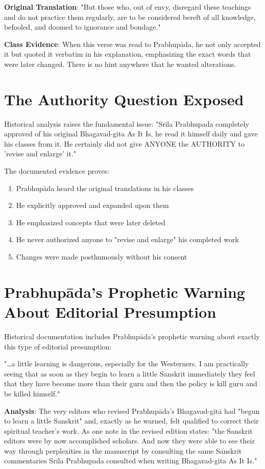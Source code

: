 \documentclass[11pt,twoside]{book}
\begin{document}
\textbf{\textbf{Original Translation}}: "But those who, out of envy, disregard these teachings and do not practice them regularly, are to be considered bereft of all knowledge, befooled, and doomed to ignorance and bondage."

\textbf{\textbf{Class Evidence}}: When this verse was read to Prabhupāda, he not only accepted it but quoted it verbatim in his explanation, emphasizing the exact words that were later changed. There is no hint anywhere that he wanted alterations.
\section*{The Authority Question Exposed}
\label{sec:orge9bd480}

Historical analysis raises the fundamental issue: "Srila Prabhupada completely approved of his original Bhagavad-gita As It Is, he read it himself daily and gave his classes from it. He certainly did not give ANYONE the AUTHORITY to 'revise and enlarge' it."

The documented evidence proves:
\begin{enumerate}
\item Prabhupāda heard the original translations in his classes
\item He explicitly approved and expanded upon them
\item He emphasized concepts that were later deleted
\item He never authorized anyone to "revise and enlarge" his completed work
\item Changes were made posthumously without his consent
\end{enumerate}
\section*{Prabhupāda's Prophetic Warning About Editorial Presumption}
\label{sec:org0435446}

Historical documentation includes Prabhupāda's prophetic warning about exactly this type of editorial presumption:

"\ldots{}a little learning is dangerous, especially for the Westerners. I am practically seeing that as soon as they begin to learn a little Sanskrit immediately they feel that they have become more than their guru and then the policy is kill guru and be killed himself."

\textbf{\textbf{Analysis}}: The very editors who revised Prabhupāda's Bhagavad-gītā had "begun to learn a little Sanskrit" and, exactly as he warned, felt qualified to correct their spiritual teacher's work. As one note in the revised edition states: "the Sanskrit editors were by now accomplished scholars. And now they were able to see their way through perplexities in the manuscript by consulting the same Sanskrit commentaries Srila Prabhupada consulted when writing Bhagavad-gita As It Is."
\end{document}
